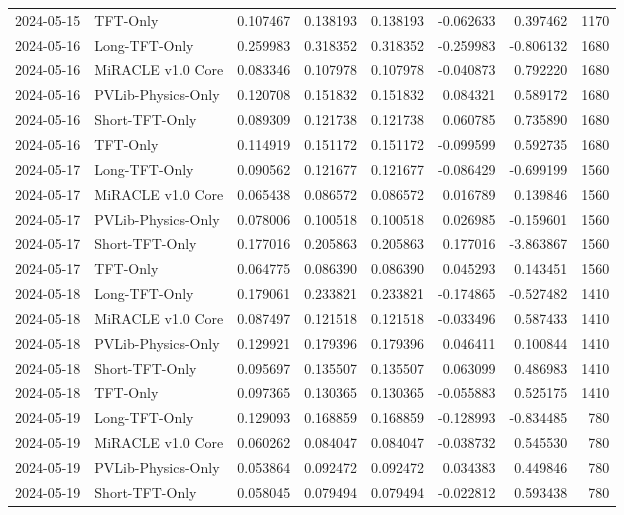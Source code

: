 \begin{tabular}{llrrrrrr}
2024-05-15 & TFT-Only & 0.107467 & 0.138193 & 0.138193 & -0.062633 & 0.397462 & 1170 \\
2024-05-16 & Long-TFT-Only & 0.259983 & 0.318352 & 0.318352 & -0.259983 & -0.806132 & 1680 \\
2024-05-16 & MiRACLE v1.0 Core & 0.083346 & 0.107978 & 0.107978 & -0.040873 & 0.792220 & 1680 \\
2024-05-16 & PVLib-Physics-Only & 0.120708 & 0.151832 & 0.151832 & 0.084321 & 0.589172 & 1680 \\
2024-05-16 & Short-TFT-Only & 0.089309 & 0.121738 & 0.121738 & 0.060785 & 0.735890 & 1680 \\
2024-05-16 & TFT-Only & 0.114919 & 0.151172 & 0.151172 & -0.099599 & 0.592735 & 1680 \\
2024-05-17 & Long-TFT-Only & 0.090562 & 0.121677 & 0.121677 & -0.086429 & -0.699199 & 1560 \\
2024-05-17 & MiRACLE v1.0 Core & 0.065438 & 0.086572 & 0.086572 & 0.016789 & 0.139846 & 1560 \\
2024-05-17 & PVLib-Physics-Only & 0.078006 & 0.100518 & 0.100518 & 0.026985 & -0.159601 & 1560 \\
2024-05-17 & Short-TFT-Only & 0.177016 & 0.205863 & 0.205863 & 0.177016 & -3.863867 & 1560 \\
2024-05-17 & TFT-Only & 0.064775 & 0.086390 & 0.086390 & 0.045293 & 0.143451 & 1560 \\
2024-05-18 & Long-TFT-Only & 0.179061 & 0.233821 & 0.233821 & -0.174865 & -0.527482 & 1410 \\
2024-05-18 & MiRACLE v1.0 Core & 0.087497 & 0.121518 & 0.121518 & -0.033496 & 0.587433 & 1410 \\
2024-05-18 & PVLib-Physics-Only & 0.129921 & 0.179396 & 0.179396 & 0.046411 & 0.100844 & 1410 \\
2024-05-18 & Short-TFT-Only & 0.095697 & 0.135507 & 0.135507 & 0.063099 & 0.486983 & 1410 \\
2024-05-18 & TFT-Only & 0.097365 & 0.130365 & 0.130365 & -0.055883 & 0.525175 & 1410 \\
2024-05-19 & Long-TFT-Only & 0.129093 & 0.168859 & 0.168859 & -0.128993 & -0.834485 & 780 \\
2024-05-19 & MiRACLE v1.0 Core & 0.060262 & 0.084047 & 0.084047 & -0.038732 & 0.545530 & 780 \\
2024-05-19 & PVLib-Physics-Only & 0.053864 & 0.092472 & 0.092472 & 0.034383 & 0.449846 & 780 \\
2024-05-19 & Short-TFT-Only & 0.058045 & 0.079494 & 0.079494 & -0.022812 & 0.593438 & 780 \\

\end{tabular}
